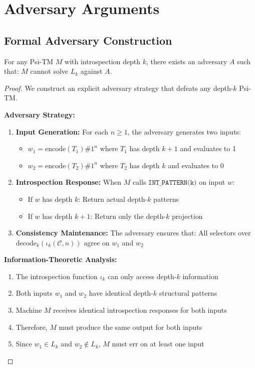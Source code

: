 \section{Adversary Arguments}

\subsection{Formal Adversary Construction}

\begin{theorem}
\label{thm:adversary-lower-bound-2}
For any Psi-TM $M$ with introspection depth $k$, there exists an adversary $A$ such that:
$M$ cannot solve $L_k$ against $A$.
\end{theorem}

\begin{proof}
We construct an explicit adversary strategy that defeats any depth-$k$ Psi-TM.

\textbf{Adversary Strategy:}
\begin{enumerate}
\item \textbf{Input Generation:} For each $n \geq 1$, the adversary generates two inputs:
  \begin{itemize}
  \item $w_1 = \text{encode}(T_1)\#1^n$ where $T_1$ has depth $k+1$ and evaluates to 1
  \item $w_2 = \text{encode}(T_2)\#1^n$ where $T_2$ has depth $k$ and evaluates to 0
  \end{itemize}

\item \textbf{Introspection Response:} When $M$ calls $\texttt{INT\_PATTERN(k)}$ on input $w$:
  \begin{itemize}
  \item If $w$ has depth $k$: Return actual depth-$k$ patterns
  \item If $w$ has depth $k+1$: Return only the depth-$k$ projection
  \end{itemize}

\item \textbf{Consistency Maintenance:} The adversary ensures that:
All selectors over $\mathrm{decode}_k(\iota_k(\mathcal{C},n))$ agree on $w_1$ and $w_2$
\end{enumerate}

\textbf{Information-Theoretic Analysis:}
\begin{enumerate}
\item The introspection function $\iota_k$ can only access depth-$k$ information
\item Both inputs $w_1$ and $w_2$ have identical depth-$k$ structural patterns
\item Machine $M$ receives identical introspection responses for both inputs
\item Therefore, $M$ must produce the same output for both inputs
\item Since $w_1 \in L_k$ and $w_2 \notin L_k$, $M$ must err on at least one input
\end{enumerate}


\end{proof}
